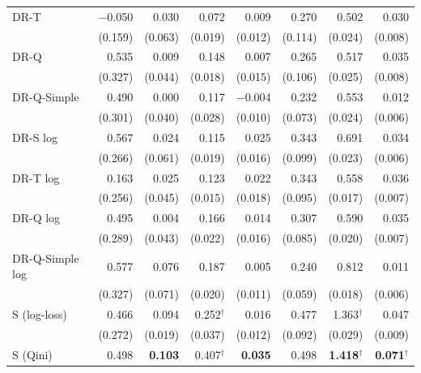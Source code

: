 \begin{tabular}{l|rrrrrrr}
DR-T & $-$0.050 & 0.030 & 0.072 & 0.009 & 0.270 & 0.502 & 0.030 \\
 & \scriptsize (0.159) & \scriptsize (0.063) & \scriptsize (0.019) & \scriptsize (0.012) & \scriptsize (0.114) & \scriptsize (0.024) & \scriptsize (0.008) \\[2pt]
DR-Q & 0.535 & 0.009 & 0.148 & 0.007 & 0.265 & 0.517 & 0.035 \\
 & \scriptsize (0.327) & \scriptsize (0.044) & \scriptsize (0.018) & \scriptsize (0.015) & \scriptsize (0.106) & \scriptsize (0.025) & \scriptsize (0.008) \\[2pt]
DR-Q-Simple & 0.490 & 0.000 & 0.117 & $-$0.004 & 0.232 & 0.553 & 0.012 \\
 & \scriptsize (0.301) & \scriptsize (0.040) & \scriptsize (0.028) & \scriptsize (0.010) & \scriptsize (0.073) & \scriptsize (0.024) & \scriptsize (0.006) \\[2pt]
\hline
DR-S log & 0.567 & 0.024 & 0.115 & 0.025 & 0.343 & 0.691 & 0.034 \\
 & \scriptsize (0.266) & \scriptsize (0.061) & \scriptsize (0.019) & \scriptsize (0.016) & \scriptsize (0.099) & \scriptsize (0.023) & \scriptsize (0.006) \\[2pt]
DR-T log & 0.163 & 0.025 & 0.123 & 0.022 & 0.343 & 0.558 & 0.036 \\
 & \scriptsize (0.256) & \scriptsize (0.045) & \scriptsize (0.015) & \scriptsize (0.018) & \scriptsize (0.095) & \scriptsize (0.017) & \scriptsize (0.007) \\[2pt]
DR-Q log & 0.495 & 0.004 & 0.166 & 0.014 & 0.307 & 0.590 & 0.035 \\
 & \scriptsize (0.289) & \scriptsize (0.043) & \scriptsize (0.022) & \scriptsize (0.016) & \scriptsize (0.085) & \scriptsize (0.020) & \scriptsize (0.007) \\[2pt]
DR-Q-Simple log & 0.577 & 0.076 & 0.187 & 0.005 & 0.240 & 0.812 & 0.011 \\
 & \scriptsize (0.327) & \scriptsize (0.071) & \scriptsize (0.020) & \scriptsize (0.011) & \scriptsize (0.059) & \scriptsize (0.018) & \scriptsize (0.006) \\[2pt]
\hline
S (log-loss) & 0.466 & 0.094 & 0.252$^\dagger$ & 0.016 & 0.477 & 1.363$^\dagger$ & 0.047 \\
 & \scriptsize (0.272) & \scriptsize (0.019) & \scriptsize (0.037) & \scriptsize (0.012) & \scriptsize (0.092) & \scriptsize (0.029) & \scriptsize (0.009) \\[2pt]
S (Qini) & 0.498 & \textbf{0.103} & 0.407$^\dagger$ & \textbf{0.035} & 0.498 & \textbf{1.418}$^\dagger$ & \textbf{0.071}$^\dagger$ \\

\end{tabular}
